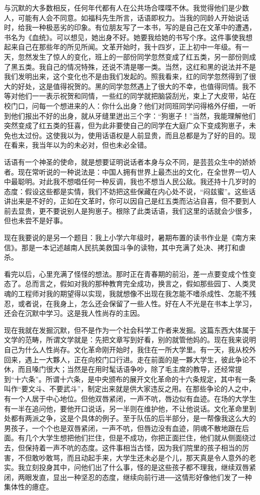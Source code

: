 与沉默的大多数相反，任何年代都有人在公共场合喋喋不休。我觉得他们是少数人，可能有人会不同意。如福科先生所言，话语即权力。当我的同龄人开始说话时，给我一种极恶劣的印象。有位朋友写了一本书，写的是自己在文革中的遭遇，书名为《血统》。可以想见，她出身不好。她要我给她的书写个序。这件事使我想起来自己在那些年的所见所闻。文革开始时，我十四岁，正上初中一年级。有一天，忽然发生了惊人的变化，班上的一部份同学忽然变成了红五类，另一部份则成了黑五类。我自己的情况特殊，还说不清是哪一类。当然，这红和黑的说法并不是我们发明出来，这个变化也不是由我们发起的。照我看来，红的同学忽然得到了很大的好处，这是值得祝贺的。黑的同学忽然遇上了很大的不幸，也值得同情。我不等对他们一一表示祝贺和同情，一些红的同学就把脑袋刮光，束上了大皮带，站在校门口，问每一个想进来的人：你什么出身？他们对同班同学问得格外仔细，一听到他们报出不好的出身，就从牙缝里迸出三个字：“狗崽子！”当然，我能理解他们突然变成了红五类的狂喜，但为此非要使自己的同学在大庭广众下变成狗崽子，未免也太过份。这使我以为，使用话语权是人前显贵，而且总都是为了好的目的。现在看来，我当年以为的未必对，但也未必全错。 

话语有一个神圣的使命，就是想要证明说话者本身与众不同，是芸芸众生中的娇娇者。现在常听说的一种说法是：中国人拥有世界上最杰出的文化，在全世界一切人中最聪明。对此我不想唱任何一种反调，我也不想当人民公敌。我还持十几岁时的态度：假设这些都是实情，我们不妨把这些保藏在内心处不说，“闷兹蜜”。这些话讲出来是不好的，正如在文革时，你可以因自己是红五类而沾沾自喜，但不要到人前去显贵，更不要说别人是狗崽子。根除了此类话语，我们这里的话就会少很多，但也未尝不是好事。 

现在我要说的是另一个题目：我上小学六年级时，暑期布置的读书作业是《南方来信》。那是一本记述越南人民抗美救国斗争的读物，其中充满了处决、拷打和虐杀。 

看完以后，心里充满了怪怪的想法。那时正在青春期的前沿，差一点要变成个性变态了。总而言之，假如对我的那种教育完全成功，换言之，假如那些园丁、人类灵魂的工程师对我的期望得以实现，我就想像不出现在我怎能不嗜杀成性、怎能不残忍，或者说，在我身上，怎么还会保留了一些人性。好在人不光是在书本上学习，还会在沉默中学习。这是我人性尚存的主因。 

现在我就在发掘沉默，但不是作为一个社会科学工作者来发掘。这篇东西大体属于文学的范畴，所谓文学就是：先把文章写到好看，别的就管他妈的。现在我来说明自己为什么人性尚存。文化革命刚开始时，我住在一所大学里。有一天，我从校外回来，遇上一大夥人，正在向校门口行进。走在前面的是一夥大学生，彼此争论不休，而且嗓门很大；当然是在用时髦话语争吵，除了毛主席的教导，还经常提到“十六条”。所谓十六条，是中央颁布的展开文化革命的十六条规定，其中有一条叫作“要文斗、不要武斗”，制定出来就是供大家违反之用。在那些争论的人之中，有一个人居于中心地位。但他双唇紧闭，一声不吭，唇边似有血迹。在场的大学生有一半在追问他，要他开口说话，另一半则在维护他，不让他说话。文化革命里到处都有两派之争，这是个具体的例子。至于队伍的后半部分，是一帮像我这么大的男孩子，一个个也是双唇紧闭，一声不吭，但唇边没有血迹，阴魂不散地跟在后面。有几个大学生想把他们拦住，但是不成功，你把正面拦住，他们就从侧面绕过去，但保持着一声不吭的态度。这件事相当古怪，因为我们院里的孩子相当的厉害，不但敢吵敢骂，而且动起手来，大学生还未必是个儿，那天真是令人意外的老实。我立刻投身其中，问他们出了什么事，怪的是这些孩子都不理我，继续双唇紧闭，两眼发直，显出一种坚忍的态度，继续向前行进──这情形好像他们发了一种集体性的癔症。 

